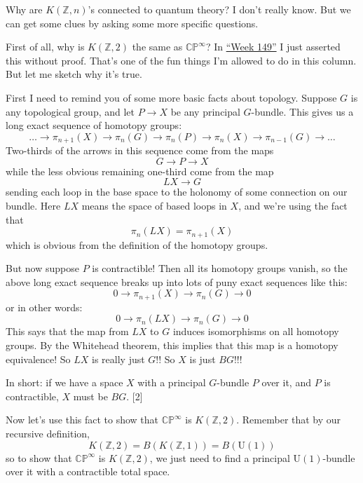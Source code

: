 \documentclass{article}
\begin{document}
Why are \(K(\mathbb{Z},n)\)'s connected to quantum theory? I don't
really know. But we can get some clues by asking some more specific
questions.

First of all, why is \(K(\mathbb{Z},2)\) the same as
\(\mathbb{CP}^\infty\)? In \protect\hyperlink{week149}{``Week 149''} I
just asserted this without proof. That's one of the fun things I'm
allowed to do in this column. But let me sketch why it's true.

First I need to remind you of some more basic facts about topology.
Suppose \(G\) is any topological group, and let \(P \to X\) be any
principal \(G\)-bundle. This gives us a long exact sequence of homotopy
groups:
\[\ldots \to \pi_{n+1}(X) \to \pi_n(G) \to \pi_n(P) \to \pi_n(X) \to \pi_{n-1}(G) \to \ldots\]
Two-thirds of the arrows in this sequence come from the maps
\[G \to P \to X\] while the less obvious remaining one-third come from
the map \[LX \to G\] sending each loop in the base space to the holonomy
of some connection on our bundle. Here \(LX\) means the space of based
loops in \(X\), and we're using the fact that
\[\pi_n(LX) = \pi_{n+1}(X)\] which is obvious from the definition of the
homotopy groups.

But now suppose \(P\) is contractible! Then all its homotopy groups
vanish, so the above long exact sequence breaks up into lots of puny
exact sequences like this: \[0 \to \pi_{n+1}(X) \to \pi_n(G) \to 0\] or
in other words: \[0 \to \pi_n(LX) \to \pi_n(G) \to 0\] This says that
the map from \(LX\) to \(G\) induces isomorphisms on all homotopy
groups. By the Whitehead theorem, this implies that this map is a
homotopy equivalence! So \(LX\) is really just \(G\)!! So \(X\) is just
\(BG\)!!!

In short: if we have a space \(X\) with a principal \(G\)-bundle \(P\)
over it, and \(P\) is contractible, \(X\) must be \(BG\). {[}2{]}

Now let's use this fact to show that \(\mathbb{CP}^\infty\) is
\(K(\mathbb{Z},2)\). Remember that by our recursive definition,
\[K(\mathbb{Z},2) = B(K(\mathbb{Z},1)) = B(\mathrm{U}(1))\] so to show
that \(\mathbb{CP}^\infty\) is \(K(\mathbb{Z},2)\), we just need to find
a principal \(\mathrm{U}(1)\)-bundle over it with a contractible total
space.
\end{document}
